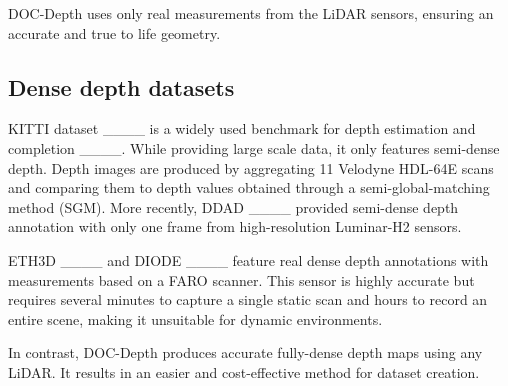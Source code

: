 DOC-Depth uses only real measurements from the LiDAR sensors, ensuring an accurate and true to life geometry. 


\subsection{Dense depth datasets}
KITTI dataset ____ is a widely used benchmark for depth estimation and completion ____. While providing large scale data, it only features semi-dense depth. Depth images are produced by aggregating 11 Velodyne HDL-64E scans and comparing them to depth values obtained through a semi-global-matching method (SGM). More recently, DDAD ____ provided semi-dense depth annotation with only one frame from high-resolution Luminar-H2 sensors. 

ETH3D ____ and DIODE ____ feature real dense depth annotations with measurements based on a FARO scanner. This sensor is highly accurate but requires several minutes to capture a single static scan and hours to record an entire scene, making it unsuitable for dynamic environments.

In contrast, DOC-Depth produces accurate fully-dense depth maps using any LiDAR. It results in an easier and cost-effective method for dataset creation.
